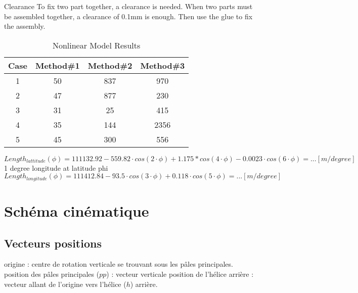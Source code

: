 \documentclass[12pt,a4paper]{article}
\begin{document}
Clearance
To fix two part together, a clearance is needed.
When two parts must be assembled together, a clearance of 0.1mm is enough. Then use the glue to fix the assembly. 



\begin{table}[ht]
	\caption{Nonlinear Model Results} %
	\centering %
	\begin{tabular}{c c c c} %
		\hline\hline %
		Case & Method\#1 & Method\#2 & Method\#3 \\ [0.5ex] %
		\hline %
		1 & 50 & 837 & 970 \\ %
		2 & 47 & 877 & 230 \\
		3 & 31 & 25 & 415 \\
		4 & 35 & 144 & 2356 \\
		5 & 45 & 300 & 556 \\ [1ex] %
		\hline %
	\end{tabular}\label{table:nonlin} %
\end{table}



\begin{equation}
	Length_{lattitude}(\phi) = 111132.92-559.82 \cdot cos(2 \cdot \phi)+1.175*cos(4 \cdot \phi)-0.0023 \cdot cos(6 \cdot \phi)= ... [m/degree]
\end{equation}
 1 degree longitude at latitude phi
\begin{equation}
	Length_{longitude}(\phi) =
	111412.84-93.5 \cdot cos(3 \cdot \phi)+ 0.118 \cdot cos(5 \cdot \phi)= ... [m/degree]
\end{equation}

\newpage
\section{Schéma cinématique}


\subsection{Vecteurs positions}
origine : centre de rotation verticale se trouvant sous les pâles principales.
\medbreak
position  des pâles principales ($pp$) : vecteur verticale
\medbreak
position de l'hélice arrière : 
vecteur allant de l'origine vers l'hélice ($h$) arrière. 
\end{document}
